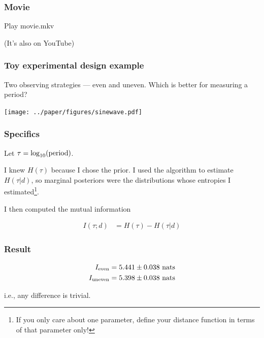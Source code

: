 \documentclass{beamer}
\begin{document}
\begin{frame}
\frametitle{Movie}

Play movie.mkv

(It's also on YouTube)

\end{frame}


\begin{frame}
\frametitle{Toy experimental design example}
Two observing strategies --- even and uneven.
Which is better for measuring a period?

\begin{center}
\texttt{[image: ../paper/figures/sinewave.pdf]}
\end{center}

\end{frame}


\begin{frame}
\frametitle{Specifics}
Let $\tau = \log_{10}(\textnormal{period})$.\vspace{0.5em}

I knew $H(\tau)$ because I chose
the prior. I used the algorithm to estimate $H(\tau | d)$,
so marginal posteriors
were the distributions whose entropies I estimated\footnote{If you only
care about one parameter, define your distance function in terms of that
parameter only!}.\vspace{0.5em}

I then computed the mutual information
\vspace{0.5em}

\begin{align}
I(\tau; d) &= H(\tau) - H(\tau | d)
\end{align}

\end{frame}

\begin{frame}
\frametitle{Result}

\begin{align}
I_{\rm even}   &= 5.441 \pm 0.038 \textnormal{ nats}\\
I_{\rm uneven} &= 5.398 \pm 0.038 \textnormal{ nats}
\end{align}

i.e., any difference is trivial.

\end{frame}
\end{document}
